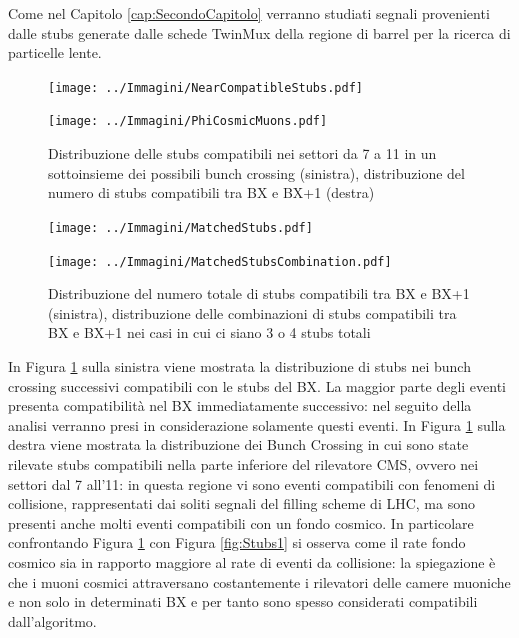 Come nel Capitolo \ref{cap:SecondoCapitolo} verranno studiati segnali provenienti dalle stubs generate dalle schede TwinMux della regione di barrel per la ricerca di particelle lente.


\begin{figure}[t]
  \centering
  \begin{minipage}[b]{0.48\textwidth}
    \centering
    \texttt{[image: ../Immagini/NearCompatibleStubs.pdf]} 
    \end{minipage}
    \hfill 
    \begin{minipage}[b]{0.48\textwidth}
      \centering
      \texttt{[image: ../Immagini/PhiCosmicMuons.pdf]} 
    \end{minipage}
    \caption{Distribuzione delle stubs compatibili nei settori da 7 a 11 in un sottoinsieme dei possibili bunch crossing (sinistra), distribuzione del numero di stubs compatibili tra BX e BX+1 (destra)}
  \label{fig:MatchedStubsRate}
\end{figure}

\begin{figure}[t]
  \centering
  \begin{minipage}[b]{0.49\textwidth}
    \centering
    \texttt{[image: ../Immagini/MatchedStubs.pdf]} 
    \end{minipage}
    \hfill 
    \begin{minipage}[b]{0.49\textwidth}
      \centering
      \texttt{[image: ../Immagini/MatchedStubsCombination.pdf]} 
    \end{minipage}
    \caption{Distribuzione del numero totale di stubs compatibili tra BX e BX+1 (sinistra), distribuzione delle combinazioni di stubs compatibili tra BX e BX+1 nei casi in cui ci siano 3 o 4 stubs totali}
  \label{fig:MatchedStubsCombination}
\end{figure}

In Figura \ref{fig:MatchedStubsRate} sulla sinistra viene mostrata la distribuzione di stubs nei bunch crossing successivi compatibili con le stubs del BX. La maggior parte degli eventi presenta compatibilità nel BX immediatamente successivo: nel seguito della analisi verranno presi in considerazione solamente questi eventi. \newline
In Figura \ref{fig:MatchedStubsRate} sulla destra viene mostrata la distribuzione dei Bunch Crossing in cui sono state rilevate stubs compatibili nella parte inferiore del rilevatore CMS, ovvero nei settori dal 7 all'11: in questa regione vi sono eventi compatibili con fenomeni di collisione, rappresentati dai soliti segnali del filling scheme di LHC, ma sono presenti anche molti eventi compatibili con un fondo cosmico. In particolare confrontando Figura \ref{fig:MatchedStubsRate} con Figura \ref{fig:Stubs1} si osserva come il rate fondo cosmico sia in rapporto maggiore al rate di eventi da collisione: la spiegazione è che i muoni cosmici attraversano costantemente i rilevatori delle camere muoniche e non solo in determinati BX e per tanto sono spesso considerati compatibili dall'algoritmo.

